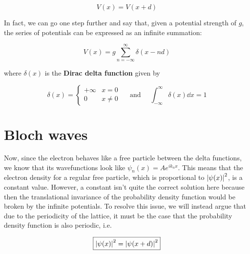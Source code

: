 \begin{equation*}
	V(x) = V(x+d)
\end{equation*}

In fact, we can go one step further and say that, given a potential strength of $g$, the series of potentials can be expressed as an infinite summation:

\begin{tcolorbox}[title = Kronig-Penney model potential] \vspace{-2ex}
	\begin{equation}
	V(x) = g \sum_{n=-\infty}^{\infty} \delta(x - nd) \label{eq:kp-pot}
	\end{equation}
\end{tcolorbox}

\noindent where $\delta(x)$ is the \textbf{Dirac delta function} given by

\begin{equation*}
	\boxed{\delta(x) = \begin{cases}
		+\infty & x=0 \\ 0 & x \neq 0
	\end{cases} \quad \text{ and } \quad 
	\int_{-\infty}^{\infty} \delta(x) \dd{x} = 1}
\end{equation*}


\section{Bloch waves}

Now, since the electron behaves like a free particle between the delta functions, we know that its wavefunctions look like $\psi_n(x) = Ae^{ik_nx}$. 
This means that the electron density for a regular free particle, which is proportional to $\abs{\psi(x)}^2$, is a constant value. 
However, a constant isn't quite the correct solution here because then the translational invariance of the probability density function would be broken by the infinite potentials. 
To resolve this issue, we will instead argue that due to the periodicity of the lattice, it must be the case that the probability density function is also periodic, i.e. 

\begin{equation}
	\boxed{\abs{\psi(x)}^2 = \abs{\psi(x+d)}^2} \label{kp-period}
\end{equation}

